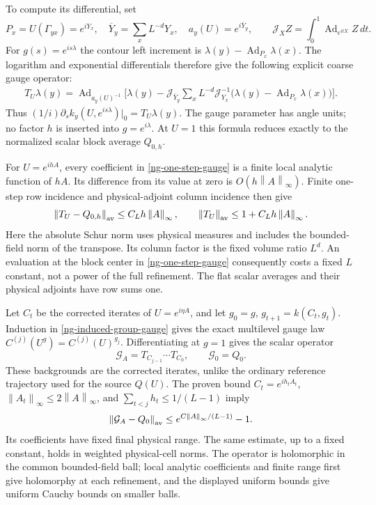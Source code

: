 \documentclass[11pt]{article}
\theoremstyle{remark}
\newcommand{\norm}[1]{\left\|#1\right\|}
\begin{document}
To compute its differential, set
\[
 P_x=U(\Gamma_{yx})=e^{iY_x},\quad
 \overline Y_y=\sum_xL^{-d}Y_x,\quad
 a_y(U)=e^{i\overline Y_y},\qquad
 \mathcal J_X Z=\int_0^1\operatorname{Ad}_{e^{itX}}Z\,dt.
\]
For $g(s)=e^{is\lambda}$ the contour left increment is
$\lambda(y)-\operatorname{Ad}_{P_x}\lambda(x)$.
The logarithm and exponential differentials therefore give the
following explicit coarse gauge operator:
\begin{equation}\label{ng-one-step-gauge}
 \begin{split}
 T_U\lambda(y)=\operatorname{Ad}_{a_y(U)^{-1}}
 \bigg[\lambda(y)-\mathcal J_{\overline Y_y}
   \sum_xL^{-d}\mathcal J_{Y_x}^{-1}
       \bigl(\lambda(y)-\operatorname{Ad}_{P_x}\lambda(x)\bigr)
 \bigg].
 \end{split}
\end{equation}
Thus $(1/i)\partial_s k_y(U,e^{is\lambda})|_0=T_U\lambda(y)$.
The gauge parameter has angle units; no factor $h$ is inserted
into $g=e^{i\lambda}$. At $U=1$ this formula reduces exactly to
the normalized scalar block average $Q_{0,h}$.

For $U=e^{ihA}$, every coefficient in
\eqref{ng-one-step-gauge} is a finite local analytic function of
$hA$. Its difference from its value at zero is $O(h\norm{A}_\infty)$.
Finite one-step row incidence and physical-adjoint column incidence
then give
\begin{equation}\label{ng-one-step-smallness}
 \norm{T_U-Q_{0,h}}_{\rm av}\le C_Lh\norm{A}_\infty,
 \qquad \norm{T_U}_{\rm av}\le1+C_Lh\norm{A}_\infty.
\end{equation}
Here the absolute Schur norm uses physical measures and includes
the bounded-field norm of the transpose. Its column factor is the
fixed volume ratio $L^d$. An evaluation at the block center in
\eqref{ng-one-step-gauge} consequently costs a fixed $L$ constant,
not a power of the full refinement. The flat scalar averages and
their physical adjoints have row sums one.

Let $C_t$ be the corrected iterates of $U=e^{i\eta A}$, and let
$g_0=g$, $g_{t+1}=k(C_t,g_t)$. Induction in
\eqref{ng-induced-group-gauge} gives the exact multilevel gauge
law $C^{(j)}(U^g)=C^{(j)}(U)^{g_j}$. Differentiating at $g=1$
gives the scalar operator
\begin{equation}\label{ng-composite-gauge}
 \mathcal G_A=T_{C_{j-1}}\cdots T_{C_0},\qquad
 \mathcal G_0=Q_0.
\end{equation}
These backgrounds are the corrected iterates, unlike the ordinary
reference trajectory used for the source $Q(U)$. The proven bound
$C_t=e^{ih_tA_t}$, $\norm{A_t}_\infty\le2\norm{A}_\infty$,
and $\sum_{t<j}h_t\le1/(L-1)$ imply
\begin{equation}\label{ng-composite-smallness}
 \norm{\mathcal G_A-Q_0}_{\rm av}
       \le e^{C\norm{A}_\infty/(L-1)}-1.
\end{equation}
Its coefficients have fixed final physical range. The same estimate,
up to a fixed constant, holds in weighted physical-cell norms.
The operator is holomorphic in the common bounded-field ball;
local analytic coefficients and finite range first give holomorphy
at each refinement, and the displayed uniform bounds give uniform
Cauchy bounds on smaller balls.
\end{document}
